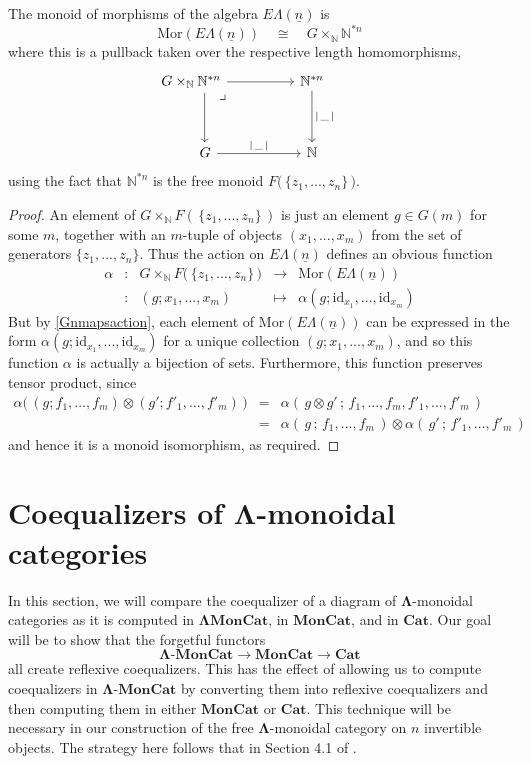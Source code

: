 \documentclass{amsbook} %
\newcommand{\mb}{\mathbf}
\newcommand{\ML}{\mathbf{\Lambda}}
\newcommand{\ELn}{E\Lambda(\underline{n})}
\newcommand{\moncat}{\ensuremath{\mb{MonCat}}}
\newcommand{\cat}{\ensuremath{\mb{Cat}}}
\numberwithin{section}{chapter}
\begin{document}
\begin{lem} \label{Gnmor} The monoid of morphisms of the algebra $\ELn$ is
\[ \mathrm{Mor}(\ELn) \quad \cong \quad G \times_{\mathbb{N}} \mathbb{N}^{\ast n} \]
where this is a pullback taken over the respective length homomorphisms,
\[ \begin{tikzcd}
G \times_{\mathbb{N}} \mathbb{N}^{\ast n} \ar[dd, shift left=4] \ar[rr] \ar[ddrr, phantom, "\lrcorner", very near start, shift left] & & \mathbb{N}^{\ast n} \ar[dd, "| \, \_ \, |"] & \\
& & & \\
\quad \quad G \ar[rr, "| \, \_ \, |"] & & \mathbb{N} &
\end{tikzcd} \]
using the fact that $\mathbb{N}^{\ast n}$ is the free monoid $F\big( \, \{z_1, ..., z_n\} \, \big)$.
\end{lem}
\begin{proof}
An element of $G \times_{\mathbb{N}} F( \, \{z_1, ..., z_n\} \, )$ is just an element $g \in G(m)$ for some $m$, together with an $m$-tuple of objects $(x_1, ..., x_m)$ from the set of generators $\{z_1, ..., z_n\}$. Thus the action on $\ELn$ defines an obvious function 
\[ \begin{array}{rlrll}
			\alpha & : & G \times_{\mathbb{N}} F\big( \, \{z_1, ..., z_n\} \, \big) & \to & \mathrm{Mor}(\ELn) \\
			& : & (g;x_1, ..., x_m) & \mapsto & \alpha(g; \mathrm{id}_{x_1}, ..., \mathrm{id}_{x_m})
		\end{array}
\]
But by \cref{Gnmapsaction}, each element of $\mathrm{Mor}(\ELn)$ can be expressed in the form $\alpha(g; \mathrm{id}_{x_1}, ..., \mathrm{id}_{x_m})$ for a unique collection $(g;x_1, ..., x_m)$, and so this function $\alpha$ is actually a bijection of sets. Furthermore, this function preserves tensor product, since
\[ \begin{array}{rll}
			\alpha\big( \, (g;f_1, ..., f_m) \otimes (g';f'_1, ..., f'_m) \, \big) & = & \alpha( \, g \otimes g' \, ; \, f_1, ..., f_m, f'_1, ..., f'_m \, ) \\
			& = & \alpha( \, g \, ; \, f_1, ..., f_m \, ) \otimes \alpha( \, g' \, ; \, f'_1, ..., f'_m \, )
		\end{array}
\]
and hence it is a monoid isomorphism, as required.
\end{proof}


\section{Coequalizers of \texorpdfstring{$\ML$}{\Lambda}-monoidal categories}
In this section, we will compare the coequalizer of a diagram of $\ML$-monoidal categories as it is computed in $\ML\moncat$, in $\moncat$, and in $\cat$. Our goal will be to show that the forgetful functors 
\[
\ML\mbox{-}\moncat \to \moncat \to \cat
\]
all create reflexive coequalizers. This has the effect of allowing us to compute coequalizers in $\ML\mbox{-}\moncat$ by converting them into reflexive coequalizers and then computing them in either $\moncat$ or $\cat$. This technique will be necessary in our construction of the free $\ML$-monoidal category on $n$ invertible objects. The strategy here follows that in Section 4.1 of \cite{lack-cod}.
\end{document}
